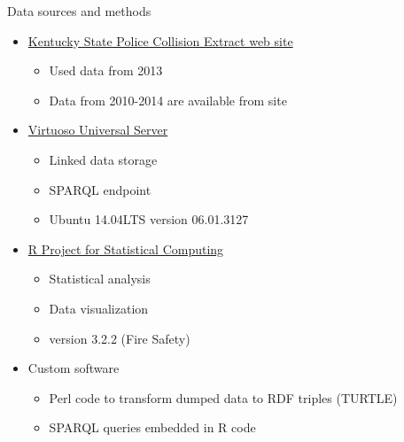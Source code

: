 \documentclass[t]{beamer}
\begin{document}
\begin{frame}{Data sources and methods}
  \begin{itemize}
  \item \href{http://crashinformationky.org/KCAP/Public/Home.aspx}{Kentucky State Police Collision Extract web site}
    \begin{itemize}
      \item Used data from 2013
      \item Data from 2010-2014 are available from site
    \end{itemize}
  \item \href{http://virtuoso.openlinksw.com/}{Virtuoso Universal Server}
    \begin{itemize}
      \item Linked data storage
      \item SPARQL endpoint
      \item Ubuntu 14.04LTS version 06.01.3127
    \end{itemize}
  \item \href{http://r-project.org}{R Project for Statistical Computing}
    \begin{itemize}
      \item Statistical analysis
      \item Data visualization
      \item version 3.2.2 (Fire Safety)
    \end{itemize}
  \item Custom software
    \begin{itemize}
      \item Perl code to transform dumped data to RDF triples (TURTLE)
      \item SPARQL queries embedded in R code
    \end{itemize}
  \end{itemize}
  \note{}
\end{frame}

\end{document}
